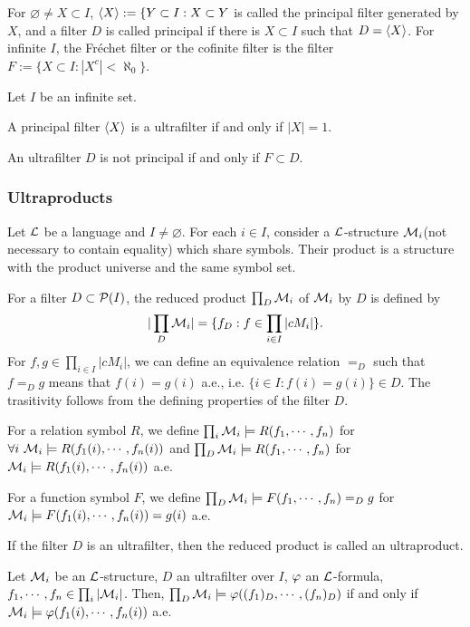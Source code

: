 \documentclass{../../../small}
\begin{document}
For $\varnothing\ne X\subset I$, $\langle X\rangle:=\{Y\subset I:X\subset Y$ is called the principal filter generated by $X$, and a filter $D$ is called principal if there is $X\subset I$ such that $D=\langle X\rangle$.
For infinite $I$, the Fr\'echet filter or the cofinite filter is the filter $F:=\{X\subset I:|X^c|<\aleph_0\}$.

\begin{prop*}
Let $I$ be an infinite set.
\begin{parts}
\item A principal filter $\langle X\rangle$ is a ultrafilter if and only if $|X|=1$.
\item An ultrafilter $D$ is not principal if and only if $F\subset D$.
\end{parts}
\end{prop*}

\subsubsection*{Ultraproducts}
Let $\mathcal{L}$ be a language and $I\ne\varnothing$.
For each $i\in I$, consider a $\mathcal{L}$-structure $\mathcal{M}_i$(not necessary to contain equality) which share symbols.
Their product is a structure with the product universe and the same symbol set.

For a filter $D\subset\mathcal{P}(I)$, the reduced product $\prod_D\mathcal{M}_i$ of $\mathcal{M}_i$ by $D$ is defined by
\[|\prod_D\mathcal{M}_i|=\{f_D:f\in\prod_{i\in I}|cM_i|\}.\]
For $f,g\in\prod_{i\in I}|cM_i|$, we can define an equivalence relation $=_D$ such that $f=_Dg$ means that $f(i)=g(i)$ a.e., i.e. $\{i\in I:f(i)=g(i)\}\in D$.
The trasitivity follows from the defining properties of the filter $D$.

For a relation symbol $R$, we define $\prod_i\mathcal{M}_i\models R(f_1,\cdots,f_n)$ for $\forall i\ \cM_i\models R(f_1(i),\cdots,f_n(i))$ and $\prod_D\mathcal{M}_i\models R(f_1,\cdots,f_n)$ for $\mathcal{M}_i\models R(f_1(i),\cdots,f_n(i))$ a.e.

For a function symbol $F$, we define $\prod_D\mathcal{M}_i\models F(f_1,\cdots,f_n)=_Dg$ for $\mathcal{M}_i\models F(f_1(i),\cdots,f_n(i))=g(i)$ a.e.

If the filter $D$ is an ultrafilter, then the reduced product is called an ultraproduct.

\begin{thm*}
Let $\mathcal{M}_i$ be an $\mathcal{L}$-structure, $D$ an ultrafilter over $I$, $\varphi$ an $\mathcal{L}$-formula, $f_1,\cdots,f_n\in\prod_i|\mathcal{M}_i|$.
Then, $\prod_D\mathcal{M}_i\models\varphi((f_1)_D,\cdots,(f_n)_D)$ if and only if $\mathcal{M}_i\models\varphi(f_1(i),\cdots,f_n(i))$ a.e.
\end{thm*}
\end{document}
